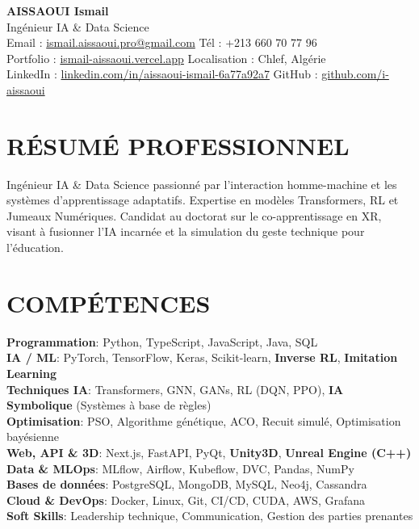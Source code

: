 \documentclass[a4paper,12pt]{article}
\begin{document}
\begin{center}
    {\Huge\bfseries\color{titleblue} AISSAOUI Ismail}\\[4pt]
    {\Large Ingénieur IA \& Data Science}\\[6pt]

    {\normalsize
    Email : \href{mailto:ismail.aissaoui.pro@gmail.com}{ismail.aissaoui.pro@gmail.com} \quad
    Tél : +213 660 70 77 96 \\
    Portfolio : \href{https://ismail-aissaoui.vercel.app}{ismail-aissaoui.vercel.app} \quad
    Localisation : Chlef, Algérie \\
    LinkedIn : \href{https://linkedin.com/in/aissaoui-ismail-6a77a92a7}{linkedin.com/in/aissaoui-ismail-6a77a92a7} \quad
    GitHub : \href{https://github.com/i-aissaoui}{github.com/i-aissaoui}
    }
\end{center}

\section{RÉSUMÉ PROFESSIONNEL}
Ingénieur IA \& Data Science passionné par l’interaction homme-machine et les systèmes d’apprentissage adaptatifs. Expertise en modèles Transformers, RL et Jumeaux Numériques. Candidat au doctorat sur le co-apprentissage en XR, visant à fusionner l’IA incarnée et la simulation du geste technique pour l’éducation.

\section{COMPÉTENCES}
\setlength{\parskip}{-1pt}
{\normalsize
\textbf{Programmation}: Python, TypeScript, JavaScript, Java, SQL \\

\textbf{IA / ML}: PyTorch, TensorFlow, Keras, Scikit-learn, \textbf{Inverse RL}, \textbf{Imitation Learning} \\

\textbf{Techniques IA}: Transformers, GNN, GANs, RL (DQN, PPO), \textbf{IA Symbolique} (Systèmes à base de règles) \\

\textbf{Optimisation}: PSO, Algorithme génétique, ACO, Recuit simulé, Optimisation bayésienne \\

\textbf{Web, API \& 3D}: Next.js, FastAPI, PyQt, \textbf{Unity3D}, \textbf{Unreal Engine (C++)} \\

\textbf{Data \& MLOps}: MLflow, Airflow, Kubeflow, DVC, Pandas, NumPy \\

\textbf{Bases de données}: PostgreSQL, MongoDB, MySQL, Neo4j, Cassandra \\

\textbf{Cloud \& DevOps}: Docker, Linux, Git, CI/CD, CUDA, AWS, Grafana \\

\textbf{Soft Skills}: Leadership technique, Communication, Gestion des parties prenantes
}
\end{document}
